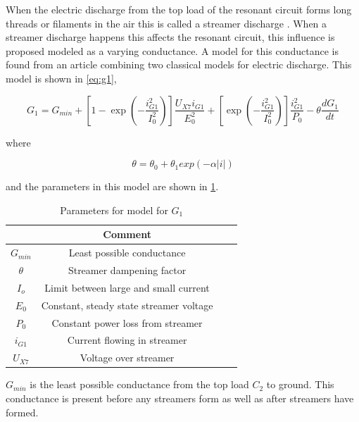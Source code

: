 When the electric discharge from the top load of the resonant circuit forms long threads or filaments in the air this is called a streamer discharge \citep{streamer}. When a streamer discharge happens this affects the resonant circuit, this influence is proposed modeled as a varying conductance. A model for this conductance is found from an article \citep{575670} combining two classical models for electric discharge. This model is shown in \cref{eq:g1},

\begin{equation} \label{eq:g1}
    G_1 = G_{min} + [ 1 - \exp(-\frac{i_{G1}^2}{I_0^2})] \frac{U_{X7} i_{G1}}{E_0^2} + [\exp(-\frac{i_{G1}^2}{I_0^2})] \frac{i_{G1}^2}{P_0} - \theta \frac{d G_1}{dt}
\end{equation}

where

\begin{equation}
    \theta = \theta_0 + \theta_1 exp(-\alpha |i|)
\end{equation}

and the parameters in this model are shown in \cref{tab:g1params}.

\begin{table}[H]
    \centering
    \begin{tabular}{c|c|c|c}
         & Comment &  &\\ \hline
        $G_{min}$ & Least possible conductance &  &\\
        $\theta$  & Streamer dampening factor &  &\\
        $I_o$     & Limit between large and small current &  &\\
        $E_0$     & Constant, steady state streamer voltage &  &\\
        $P_0$     & Constant power loss from streamer &  & \\
        $i_{G1}$  & Current flowing in streamer      &  & \\
        $U_{X7}$     & Voltage over streamer            &  &
    \end{tabular}
    \caption{Parameters for model for $G_1$}
    \label{tab:g1params}
\end{table}

$G_{min}$ is the least possible conductance from the top load $C_2$ to ground. This conductance is present before any streamers form as well as after streamers have formed.


